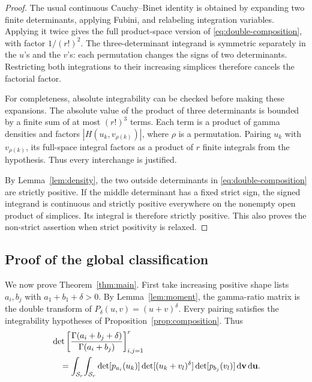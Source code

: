 \documentclass[11pt,a4paper]{article}
\theoremstyle{definition}
\theoremstyle{remark}
\newcommand{\dd}{\,\mathrm d}
\newcommand{\simplex}[1]{\mathcal S_{#1}}
\begin{document}
\begin{proof}
The usual continuous Cauchy--Binet identity is obtained by expanding two
finite determinants, applying Fubini, and relabeling integration
variables. Applying it twice gives the full product-space version of
\eqref{eq:double-composition}, with factor \(1/(r!)^2\).
The three-determinant integrand is symmetric separately in the \(u\)'s
and the \(v\)'s: each permutation changes the signs of two determinants.
Restricting both integrations to their increasing simplices therefore
cancels the factorial factor.

For completeness, absolute integrability can be checked before making
these expansions. The absolute value of the product of three
determinants is bounded by a finite sum of at most \((r!)^3\) terms.
Each term is a product of gamma densities and factors
\(|H(u_k,v_{\rho(k)})|\), where \(\rho\) is a permutation. Pairing
\(u_k\) with \(v_{\rho(k)}\), its full-space integral factors as a
product of \(r\) finite integrals from the hypothesis. Thus every
interchange is justified.

By Lemma~\ref{lem:density}, the two outside determinants in
\eqref{eq:double-composition} are strictly positive. If the middle
determinant has a fixed strict sign, the signed integrand is continuous
and strictly positive everywhere on the nonempty open product of
simplices. Its integral is therefore strictly positive. This also proves
the non-strict assertion when strict positivity is relaxed.
\end{proof}

\subsection{Proof of the global classification}

We now prove Theorem~\ref{thm:main}. First take increasing positive shape
lists \(a_i,b_j\) with
\(a_1+b_1+\delta>0\). By Lemma~\ref{lem:moment}, the gamma-ratio
matrix is the double transform of \(P_\delta(u,v)=(u+v)^\delta\).
Every pairing satisfies the integrability hypotheses of
Proposition~\ref{prop:composition}. Thus
\begin{align}\label{eq:gamma-determinant-integral}
 &\det\left[
 \frac{\Gamma(a_i+b_j+\delta)}{\Gamma(a_i+b_j)}
 \right]_{i,j=1}^{r}\notag\\
 &\quad=\int_{\simplex r}\!\int_{\simplex r}
 \det[p_{a_i}(u_k)]
 \det[(u_k+v_l)^\delta]
 \det[p_{b_j}(v_l)]
 \dd\mathbf v\dd\mathbf u.
\end{align}
\end{document}
